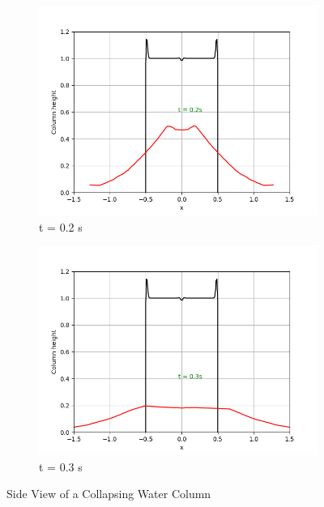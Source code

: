 \documentclass{article}
\begin{document}
\begin{figure}[!htbp]
\begin{subfigure}{.5\textwidth}
  \includegraphics[width=1.1\linewidth]{circ_dam_t2.png}
  \caption{t = 0.2 s}
  \label{fig:sub3}
\end{subfigure}%
\begin{subfigure}{.5\textwidth}
  \centering
  \includegraphics[width=1.1\linewidth]{circ_dam_t3.png}
  \caption{t = 0.3 s}
  \label{fig:sub4}
\end{subfigure}
\caption{Side View of a Collapsing Water Column}
\label{fig:sidecollapse}
\end{figure}
\end{document}
